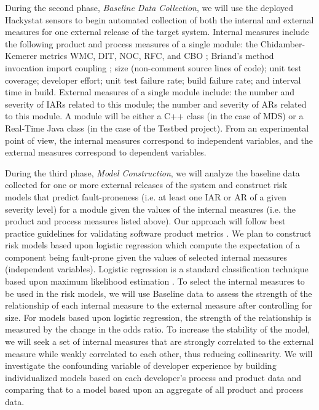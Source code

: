 During the second phase, {\em Baseline Data Collection}, we will use the
deployed Hackystat sensors to begin automated collection of both the
internal and external measures for one external release of the target
system.  Internal measures include the following product and process
measures of a single module: the Chidamber-Kemerer metrics WMC, DIT, NOC,
RFC, and CBO \cite{Chidamber94}; Briand's method invocation import coupling
\cite{Briand01}; size (non-comment source lines of code); unit test
coverage; developer effort; unit test failure rate; build failure rate; and
interval time in build.  External measures of a single module include: the
number and severity of IARs related to this module; the number and severity
of ARs related to this module.  A module will be either a C++ class (in the
case of MDS) or a Real-Time Java class (in the case of the Testbed
project).  From an experimental point of view, the internal measures
correspond to independent variables, and the external measures correspond
to dependent variables.

During the third phase, {\em Model Construction}, we will analyze the
baseline data collected for one or more external releases of the system and
construct risk models that predict fault-proneness (i.e. at least one IAR
or AR of a given severity level) for a module given the values of the
internal measures (i.e. the product and process measures listed above).
Our approach will follow best practice guidelines for validating software
product metrics \cite{Emam00}.  We plan to construct risk models based
upon logistic regression which compute the expectation of a component
being fault-prone given the values of selected internal measures
(independent variables).  Logistic regression is a standard classification
technique based upon maximum likelihood estimation
\cite{Hosmer89,Khoshgoftaar99}. To select the internal measures to be used
in the risk models, we will use  Baseline data to assess
the strength of the relationship of each internal measure to the external
measure after controlling for size. For models based upon logistic regression, the
strength of the relationship is measured by the change in the odds ratio.
To increase the stability of the model, we will seek a set of internal
measures that are strongly correlated to the external measure while weakly
correlated to each other, thus reducing collinearity.  We will investigate
the confounding variable of developer experience by building individualized
models based on each developer's process and product data and comparing
that to a model based upon an aggregate of all product and process data.

